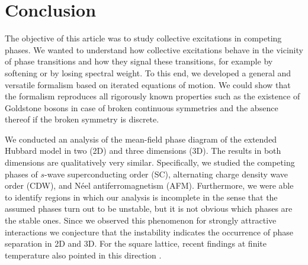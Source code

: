 \documentclass[
    reprint, 
    aps,
    preprintnumbers,
    twocolumn,
    prb,
    superscriptaddress
]{revtex4-2}
\begin{document}

\section{Conclusion}\label{sec:conclusion}


The objective of this article was to study collective excitations in competing phases.
We wanted to understand how collective excitations behave in the vicinity of phase transitions
and how they signal these transitions, for example by softening or by losing spectral weight.
To this end, we developed a general and versatile formalism based on iterated equations of motion.
We could show that the formalism reproduces all rigorously known properties such as
the existence of Goldstone bosons in case of broken continuous symmetries and the absence thereof
if the broken symmetry is discrete.

We conducted an analysis of the mean-field phase diagram of the extended Hubbard model in 
two (2D) and three dimensions (3D). The results in both dimensions are qualitatively very similar.
Specifically, we studied the competing phases 
of $s$-wave superconducting order (SC), alternating charge density wave order
(CDW), and N\'eel antiferromagnetism (AFM).
Furthermore, we were able to identify regions in which our analysis is incomplete
in the sense that the assumed phases turn out to be unstable, but it is not obvious which
phases are the stable ones. Since we observed this phenomenon for strongly attractive interactions
we conjecture that the instability indicates the occurrence of phase separation in 2D and 3D. 
For the square lattice, recent findings at finite temperature also pointed in this direction \cite{Linner23}.
\end{document}
